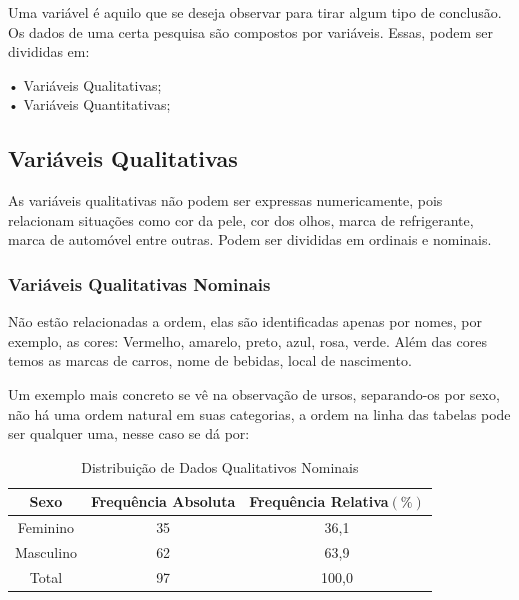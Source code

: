 \documentclass[
	12pt,				%
	oneside,			%
	a4paper,			%
	english,			%
	french,				%
	spanish,			%
	brazil,				%
	]{abntex2}
\begin{document}
Uma variável é aquilo que se deseja observar para tirar algum tipo de conclusão. Os dados de uma certa pesquisa são compostos por variáveis. Essas, podem ser divididas em: 

\begin{center}
•	Variáveis Qualitativas;\\
•	Variáveis Quantitativas;\\

\end{center}
\subsection{Variáveis Qualitativas}

As variáveis qualitativas não podem ser expressas numericamente, pois relacionam
situações como cor da pele, cor dos olhos, marca de refrigerante, marca de automóvel entre
outras. Podem ser divididas em ordinais e nominais.\cite{variaveis}

\subsubsection{Variáveis Qualitativas Nominais}

Não estão relacionadas a ordem, elas são identificadas apenas por nomes, por
exemplo, as cores: Vermelho, amarelo, preto, azul, rosa, verde. Além das cores temos as
marcas de carros, nome de bebidas, local de nascimento.\cite{variaveis5}

Um exemplo mais concreto se vê na observação de ursos, separando-os por sexo, não
há uma ordem natural em suas categorias, a ordem na linha das tabelas pode ser qualquer
uma, nesse caso se dá por:

\begin{center}
\begin{table}[H]
\caption{Distribuição de Dados Qualitativos Nominais}
\begin{center}
\begin{tabular}{c|c|c}

\hline
Sexo & Frequência Absoluta & Frequência Relativa$(\%)$ \\ 
\hline
Feminino & 35 & 36,1 \\
\hline
Masculino & 62 & 63,9 \\
\hline
Total & 97 & 100,0 \\

\end{tabular}
\end{center}
\end{table}
\end{center}
\end{document}
